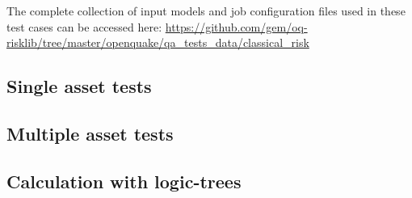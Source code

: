 The complete collection of input models and job configuration files used in these test cases can be accessed here:
\href{https://github.com/gem/oq-risklib/tree/master/openquake/qa_tests_data/classical_risk}
{https://github.com/gem/oq-risklib/tree/master/openquake/qa\_tests\_data/classical\_risk}

\subsection{Single asset tests}
\label{subsec:acc-cr-single}


\subsection{Multiple asset tests}
\label{subsec:acc-cr-multiple}


% 

\subsection{Calculation with logic-trees}
\label{subsec:acc-cr-lt}


